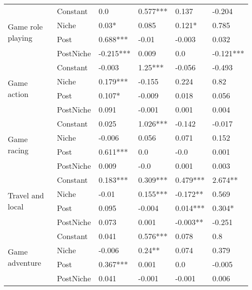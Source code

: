 \begin{longtable}[h!]{llllll}
\cline{1-6}
\multirow{4}{*}{Game role playing} & Constant &                 0.0 &    0.577*** &      0.137 &     -0.204 \\
          & Niche &               0.03* &       0.085 &     0.121* &      0.785 \\
          & Post &            0.688*** &       -0.01 &     -0.003 &      0.032 \\
          & PostNiche &           -0.215*** &       0.009 &        0.0 &  -0.121*** \\
\cline{1-6}
\multirow{4}{*}{Game action} & Constant &              -0.003 &     1.25*** &     -0.056 &     -0.493 \\
          & Niche &            0.179*** &      -0.155 &      0.224 &       0.82 \\
          & Post &              0.107* &      -0.009 &      0.018 &      0.056 \\
          & PostNiche &               0.091 &      -0.001 &      0.001 &      0.004 \\
\cline{1-6}
\multirow{4}{*}{Game racing} & Constant &               0.025 &    1.026*** &     -0.142 &     -0.017 \\
          & Niche &              -0.006 &       0.056 &      0.071 &      0.152 \\
          & Post &            0.611*** &         0.0 &       -0.0 &      0.001 \\
          & PostNiche &               0.009 &        -0.0 &      0.001 &      0.003 \\
\cline{1-6}
\multirow{4}{*}{Travel and local} & Constant &            0.183*** &    0.309*** &   0.479*** &    2.674** \\
          & Niche &               -0.01 &    0.155*** &   -0.172** &      0.569 \\
          & Post &               0.095 &      -0.004 &   0.014*** &     0.304* \\
          & PostNiche &               0.073 &       0.001 &   -0.003** &     -0.251 \\
\cline{1-6}
\multirow{4}{*}{Game adventure} & Constant &               0.041 &    0.576*** &      0.078 &        0.8 \\
          & Niche &              -0.006 &      0.24** &      0.074 &      0.379 \\
          & Post &            0.367*** &       0.001 &        0.0 &     -0.005 \\
          & PostNiche &               0.041 &      -0.001 &     -0.001 &      0.006 \\

\end{longtable}
